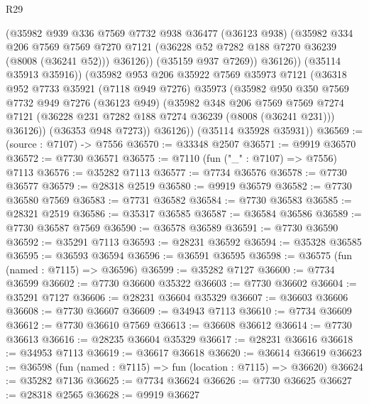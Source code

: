 \begin{lexlean}{R29}
\begin{coremodule}
                (@35982
                  @939
                  @336
                  @7569
                  @7732
                  @938
                  @36477
                  (@36123 @938)
                  (@35982
                    @334
                    @206
                    @7569
                    @7569
                    @7270
                    @7121
                    (@36228 @52 @7282 @188 @7270 @36239 (@8008 (@36241 @52)))
                    @36126))
                (@35159 @937 @7269))
              @36126))
          (@35114 @35913 @35916))
        (@35982
          @953
          @206
          @35922
          @7569
          @35973
          @7121
          (@36318
            @952
            @7733
            @35921
            (@7118 @949 @7276)
            @35973
            (@35982
              @950
              @350
              @7569
              @7732
              @949
              @7276
              (@36123 @949)
              (@35982
                @348
                @206
                @7569
                @7569
                @7274
                @7121
                (@36228 @231 @7282 @188 @7274 @36239 (@8008 (@36241 @231)))
                @36126))
            (@36353 @948 @7273))
          @36126))
      (@35114 @35928 @35931))
@36569 := (source : @7107) -> @7556
@36570 := @33348 @2507
@36571 := @9919 @36570
@36572 := @7730 @36571
@36575 := @7110 (fun ("_" : @7107) => @7556) @7113
@36576 := @35282 @7113
@36577 := @7734 @36576
@36578 := @7730 @36577
@36579 := @28318 @2519
@36580 := @9919 @36579
@36582 := @7730 @36580 @7569
@36583 := @7731 @36582
@36584 := @7730 @36583
@36585 := @28321 @2519
@36586 := @35317 @36585
@36587 := @36584 @36586
@36589 := @7730 @36587 @7569
@36590 := @36578 @36589
@36591 := @7730 @36590
@36592 := @35291 @7113
@36593 := @28231 @36592
@36594 := @35328 @36585
@36595 := @36593 @36594
@36596 := @36591 @36595
@36598 := @36575 (fun (named : @7115) => @36596)
@36599 := @35282 @7127
@36600 := @7734 @36599
@36602 := @7730 @36600 @35322
@36603 := @7730 @36602
@36604 := @35291 @7127
@36606 := @28231 @36604 @35329
@36607 := @36603 @36606
@36608 := @7730 @36607
@36609 := @34943 @7113
@36610 := @7734 @36609
@36612 := @7730 @36610 @7569
@36613 := @36608 @36612
@36614 := @7730 @36613
@36616 := @28235 @36604 @35329
@36617 := @28231 @36616
@36618 := @34953 @7113
@36619 := @36617 @36618
@36620 := @36614 @36619
@36623 := @36598 (fun (named : @7115) => fun (location : @7115) => @36620)
@36624 := @35282 @7136
@36625 := @7734 @36624
@36626 := @7730 @36625
@36627 := @28318 @2565
@36628 := @9919 @36627

\end{coremodule}
\end{lexlean}
